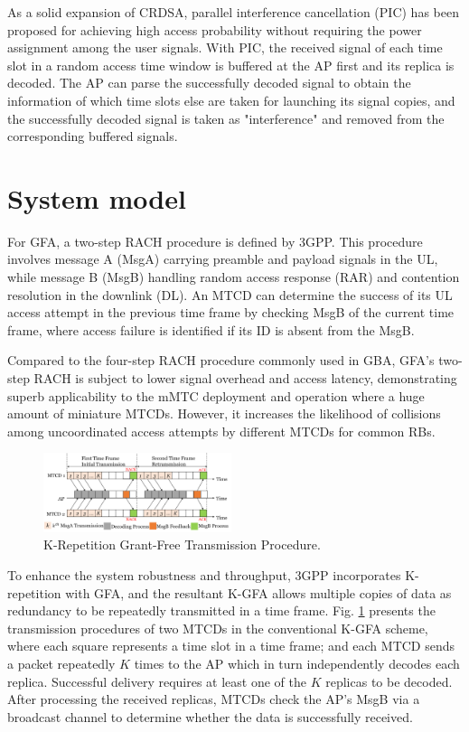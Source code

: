 \documentclass[a4paper]{IEEEtran}
\begin{document}
As a solid expansion of CRDSA, parallel interference cancellation (PIC) \cite{PIC1} has been proposed for achieving high access probability without requiring the power assignment among the user signals. With PIC, the received signal of each time slot in a random access time window is buffered at the AP first and its replica is decoded. The AP can parse the successfully decoded signal to obtain the information of which time slots else are taken for launching its signal copies, and the successfully decoded signal is taken as "interference" and removed from the corresponding buffered signals.

\section{System model}
For GFA, a two-step RACH procedure \cite{2-rach} is defined by 3GPP. This procedure involves message A (MsgA) carrying preamble and payload signals in the UL, while message B (MsgB) handling random access response (RAR) and contention resolution in the downlink (DL). An MTCD can determine the success of its UL access attempt in the previous time frame by checking MsgB of the current time frame, where access failure is identified if its ID is absent from the MsgB.

Compared to the four-step RACH procedure \cite{4-rach} commonly used in GBA, GFA's two-step RACH is subject to lower signal overhead and access latency, demonstrating superb applicability to the mMTC deployment and operation where a huge amount of miniature MTCDs. However, it increases the likelihood of collisions among uncoordinated access attempts by different MTCDs for common RBs.

\begin{figure}[btp]
    \centering
    \includegraphics[width=0.49\textwidth]{Figs/K-repV2.png}
    \caption{K-Repetition Grant-Free Transmission Procedure.}
    \label{fig: k-rep}
\end{figure}

To enhance the system robustness and throughput, 3GPP incorporates K-repetition \cite{k-repetition} with GFA, and the resultant K-GFA allows multiple copies of data as redundancy to be repeatedly transmitted in a time frame. Fig. \ref{fig: k-rep} presents the transmission procedures of two MTCDs in the conventional K-GFA scheme, where each square represents a time slot in a time frame; and each MTCD sends a packet repeatedly $K$ times to the AP which in turn independently decodes each replica. Successful delivery requires at least one of the $K$ replicas to be decoded. After processing the received replicas, MTCDs check the AP's MsgB via a broadcast channel to determine whether the data is successfully received.
\end{document}
